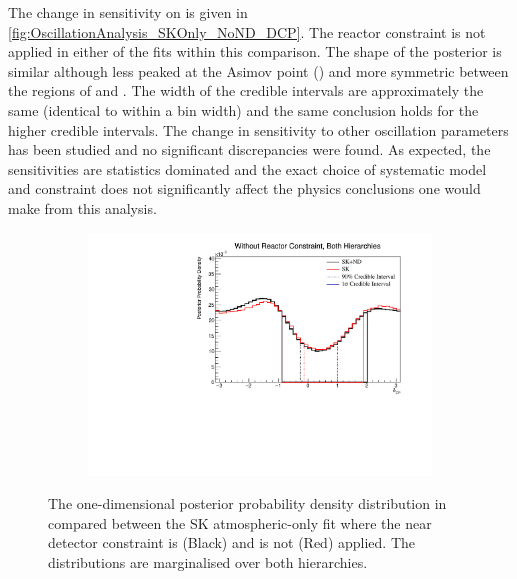 The change in sensitivity on  is given in \autoref{fig:OscillationAnalysis_SKOnly_NoND_DCP}. The reactor constraint is not applied in either of the fits within this comparison. The shape of the posterior is similar although less peaked at the Asimov point () and more symmetric between the regions of  and . The width of the \quickmath{1\sigma} credible intervals are approximately the same (identical to within a bin width) and the same conclusion holds for the higher credible intervals. The change in sensitivity to other oscillation parameters has been studied and no significant discrepancies were found. As expected, the sensitivities are statistics dominated and the exact choice of systematic model and constraint does not significantly affect the physics conclusions one would make from this analysis.

\begin{figure}[h]
  \begin{subfigure}[t]{0.98\textwidth}
    \includegraphics[width=\textwidth, trim={0mm 0mm 0mm 0mm}, clip,page=1]{Figures/OA/SKOnlyFit_noND/ContourComparison_1D_dcp_BH_2_woRC_UnSmeared_CredibleInterval.pdf}
  \end{subfigure}
  \caption{The one-dimensional posterior probability density distribution in  compared between the SK atmospheric-only fit where the near detector constraint is (Black) and is not (Red) applied. The distributions are marginalised over both hierarchies.}
  \label{fig:OscillationAnalysis_SKOnly_NoND_DCP}
\end{figure}

